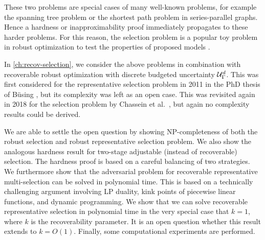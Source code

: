 These two problems are special cases of many well-known problems, for example the spanning tree problem or the shortest path problem in series-parallel graphs. Hence a hardness or inapproximability proof immediately propagates to these harder problems. For this reason, the selection problem is a popular toy problem in robust optimization to test the properties of proposed models \cite{averbakh2001complexity,conde2004improved,dolgui2012min,deineko2013complexity,goerigk2019robust} 
.

In \cref{ch:recov-selection}, we consider the above problems in combination with recoverable robust optimization with discrete budgeted uncertainty $\mathcal{U}^d_\Gamma$. 
This was first considered for the representative selection problem in 2011 in the PhD thesis of Büsing \cite{busing2011phd}, but its complexity was left as an open case. 
This was revisited again in 2018 for the selection problem by Chassein et al.\ \cite{chassein2018recoverable}, but again no complexity results could be derived. 

We are able to settle the open question by showing NP-completeness of both the robust selection and robust representative selection problem. We also show the  analogous hardness result for two-stage adjustable (instead of recoverable) selection.
The hardness proof is based on a careful balancing of two strategies. We furthermore show that the adversarial problem for recoverable representative multi-selection can be solved in polynomial time. This is based on a technically challenging argument involving LP duality, kink points of piecewise linear functions, and dynamic programming.
We show that we can solve recoverable representative selection in polynomial time in the very special case that $k=1$, where $k$ is the recoverability parameter. It is an open question whether this result extends to $k = O(1)$. Finally, some computational experiments are performed.
 
